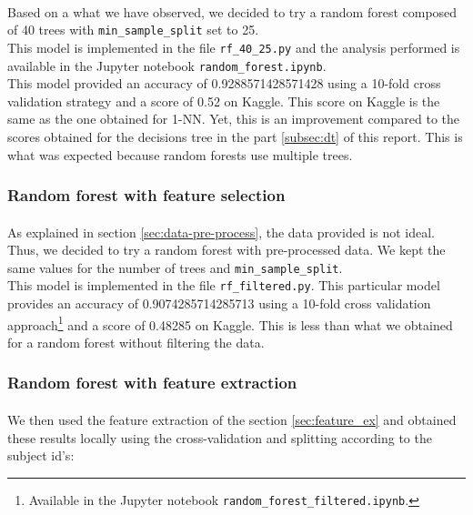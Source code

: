 \documentclass[a4paper, 11pt, oneside]{article}
\begin{document}
\paragraph{}Based on a what we have observed, we decided to try a random forest composed of 40 trees with \texttt{min\_sample\_split} set to 25.\\
This model is implemented in the file \texttt{rf\_40\_25.py} and the analysis performed is available in the Jupyter notebook \texttt{random\_forest.ipynb}.\\
This model provided an accuracy of 0.9288571428571428 using a 10-fold cross validation strategy and a score of 0.52 on Kaggle. This score on Kaggle is the same as the one obtained for 1-NN. Yet, this is an improvement compared to the scores obtained for the decisions tree in the part \ref{subsec:dt} of this report. This is what was expected because random forests use multiple trees.

\subsubsection{Random forest with feature selection} \label{subsubsec:rfFiltered}
\paragraph{}As explained in section \ref{sec:data-pre-process}, the data provided is not ideal. Thus, we decided to try a random forest with pre-processed data. We kept the same values for the number of trees and \texttt{min\_sample\_split}.\\
This model is implemented in the file \texttt{rf\_filtered.py}. This particular model provides an accuracy of 0.9074285714285713 using a 10-fold cross validation approach\footnote{Available in the Jupyter notebook \texttt{random\_forest\_filtered.ipynb}.} and a score of 0.48285 on Kaggle. This is less than what we obtained for a random forest without filtering the data.

\subsubsection{Random forest with feature extraction} \label{subsubsec:rf_feature_extraction}
\paragraph{}We then used the feature extraction of the section \ref{sec:feature_ex} and obtained these results locally using the cross-validation and splitting according to the subject id's: 
\end{document}
